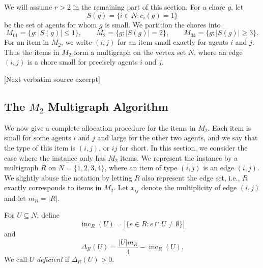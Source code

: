 \documentclass[10pt]{article}
\begin{document}
\begin{ReviewVerbatim}

We will assume $r>2$ in the remaining part of this section.
For a chore $g$, let
\[
 S(g)=\{i\in N:c_i(g)=1\}
\]
be the set of agents for whom $g$ is small.  We partition the chores into
\[
M_{01}=\{g:|S(g)|\le 1\},\qquad
M_2=\{g:|S(g)|=2\},\qquad
M_{34}=\{g:|S(g)|\ge 3\}.
\]
For an item in $M_2$, we write $(i,j)$ for an item small exactly for agents
$i$ and $j$.  Thus the items in $M_2$ form a multigraph on the vertex set
$N$, where an edge $(i,j)$ is a chore small for precisely agents $i$ and $j$.

[Next verbatim source excerpt]

\subsection{The $M_2$ Multigraph Algorithm}
\label{subsec:2}
We now give a complete allocation procedure for the items in $M_2$.
Each item is small for some agents $i$ and $j$ and
large for the other two agents, and we say that the type of this item is $(i,j)$, or $ij$ for short.
In this section, we consider the case where the instance only has $M_{2}$ items.
We represent the instance by a
multigraph $R$ on $N=\{1,2,3,4\}$, where an item of type $(i,j)$ is an edge $(i,j)$.
We slightly abuse the notation by letting $R$ also represent the edge set, i.e., $R$ exactly corresponds to items in $M_2$.
Let $x_{ij}$ denote the multiplicity of edge $(i,j)$ and let $m_R=|R|$.

For $U\subseteq N$, define
\[
 \operatorname{inc}_R(U)=\left|\{e\in R:e\cap U\neq\emptyset\}\right|
\]
and
\[
 \Delta_R(U)=\frac{|U|m_R}{4}-\operatorname{inc}_R(U).
\]
We call $U$ \emph{deficient} if $\Delta_R(U)>0$.
\end{ReviewVerbatim}
\end{document}
